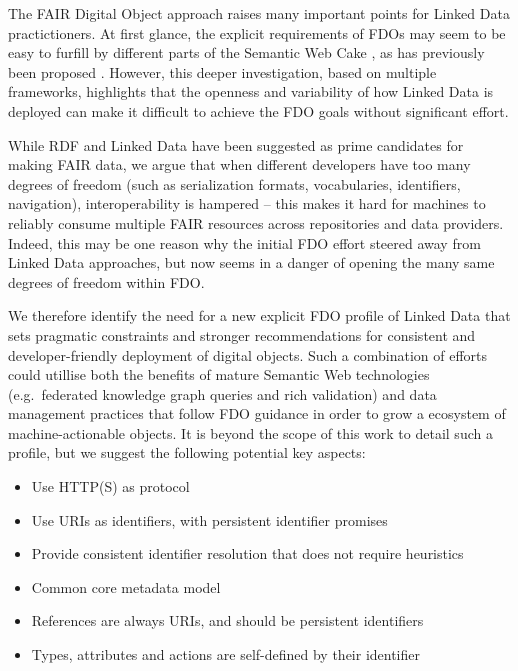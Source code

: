 \documentclass[fleqn,10pt,NOlineno]{wlpeerjlua}
\providecommand{\tightlist}{%
  \setlength{\itemsep}{0pt}\setlength{\parskip}{0pt}}
\begin{document}
The FAIR Digital Object approach raises many important points for Linked Data practictioners.
At first glance, the explicit requirements of FDOs may seem to be easy to furfill by different parts of the Semantic Web Cake \autocite[][slide 10]{SemanticWebXML2000}, as  has previously been proposed \autocite{10.3897/rio.8.e94501}.
However, this deeper investigation, based on multiple frameworks, highlights that the openness and variability of how Linked Data is deployed can make it difficult to achieve the FDO goals without significant effort.

While RDF and Linked Data have been suggested as prime candidates for making FAIR data, we argue that when different developers have too many degrees of freedom (such as serialization formats, vocabularies, identifiers, navigation), interoperability is hampered -- this makes it hard for machines to reliably consume multiple FAIR resources across repositories and data providers. 
Indeed, this may be one reason why the initial FDO effort steered away from Linked Data approaches, but now seems in a danger of opening the many same degrees of freedom within FDO.

We therefore identify the need for a new explicit FDO profile of Linked Data that sets pragmatic constraints and stronger recommendations for consistent and developer-friendly deployment of digital objects. 
Such a combination of efforts could utillise both the benefits of mature Semantic Web technologies (e.g.~federated knowledge graph queries and rich validation) and data management practices that follow FDO guidance in order to grow a ecosystem of machine-actionable objects. 
It is beyond the scope of this work to detail such a profile, but we suggest the following potential key aspects:

\begin{itemize}
  \tightlist
  \item Use HTTP(S) as protocol
  \item Use URIs as identifiers, with persistent identifier promises
  \item Provide consistent identifier resolution that does not require heuristics
  \item Common core metadata model
  \item References are always URIs, and should be persistent identifiers
  \item Types, attributes and actions are self-defined by their identifier
\end{itemize}
\end{document}

